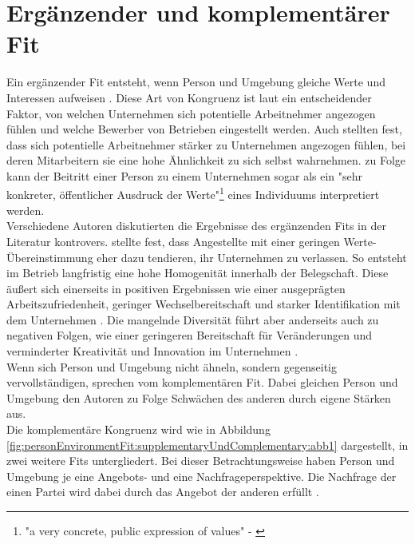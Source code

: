 \section{Ergänzender und komplementärer Fit}
\label{ch:personEnvironmentFit:supplementaryUndComplementary}
Ein ergänzender Fit entsteht, wenn Person und Umgebung gleiche Werte und Interessen aufweisen \cite[S. 2f.]{muchinsky:1987}. Diese Art von Kongruenz ist laut \textcite[S. 1ff.]{schneider:1987} ein entscheidender Faktor, von welchen Unternehmen sich potentielle Arbeitnehmer angezogen fühlen und welche Bewerber von Betrieben eingestellt werden. Auch \textcite[S. 7]{devendorf:2008} stellten fest, dass sich potentielle Arbeitnehmer stärker zu Unternehmen angezogen fühlen, bei deren Mitarbeitern sie eine hohe Ähnlichkeit zu sich selbst wahrnehmen. \textcite[S. 4]{popovich:1982} zu Folge kann der Beitritt einer Person zu einem Unternehmen sogar als ein "sehr konkreter, öffentlicher Ausdruck der Werte"\footnote{"a very concrete, public expression of values" - \textcite[S. 4]{popovich:1982}} eines Individuums interpretiert werden.\\
Verschiedene Autoren diskutierten die Ergebnisse des ergänzenden Fits in der Literatur kontrovers. \textcite[S. 6]{schneider:1987} stellte fest, dass Angestellte mit einer geringen Werte-Übereinstimmung eher dazu tendieren, ihr Unternehmen zu verlassen. So entsteht im Betrieb langfristig eine hohe Homogenität innerhalb der Belegschaft. Diese äußert sich einerseits in positiven Ergebnissen wie einer ausgeprägten Arbeitszufriedenheit, geringer Wechselbereitschaft und starker Identifikation mit dem Unternehmen \cite[S. 25ff.]{kristof:1996}\cite[S. 5]{su:2015}. Die mangelnde Diversität führt aber anderseits auch zu negativen Folgen, wie einer geringeren Bereitschaft für Veränderungen \cite[S. 10]{schneider:1987} und verminderter Kreativität und Innovation im Unternehmen \cite[S. 7]{chatman:1998}.\\
Wenn sich Person und Umgebung nicht ähneln, sondern gegenseitig vervollständigen, sprechen \textcite[S. 4]{muchinsky:1987} vom komplementären Fit. Dabei gleichen Person und Umgebung den Autoren zu Folge Schwächen des anderen durch eigene Stärken aus.\\
Die komplementäre Kongruenz wird wie in Abbildung \ref{fig:personEnvironmentFit:supplementaryUndComplementary:abb1} dargestellt, in zwei weitere Fits untergliedert. Bei dieser Betrachtungsweise haben Person und Umgebung je eine Angebots- und eine Nachfrageperspektive. Die Nachfrage der einen Partei wird dabei durch das Angebot der anderen erfüllt \cite[S. 2ff.]{caplan:1987}\cite[S. 2f.]{edwards:1991}.\\
